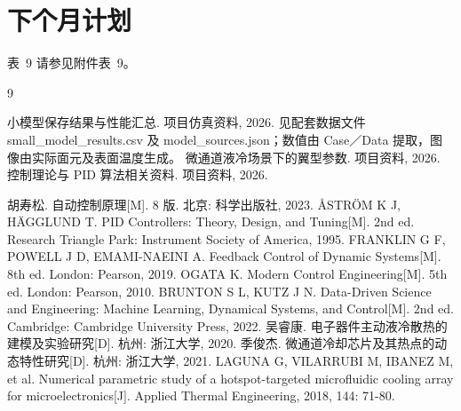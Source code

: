 \documentclass[stage2,fontset=fandol]{ydzjreport}
\makeatletter
\newcommand{\submissionnumber}[1]{\def\@currentlabel{#1}}
\makeatother
\begin{document}
\section{下个月计划}


\par\noindent \begingroup\submissionnumber{9}\label{tab:plan}\endgroup 表~9 请参见附件表~9。\par




\begin{thebibliography}{9}

 小模型保存结果与性能汇总. 项目仿真资料, 2026. 见配套数据文件 small\_model\_results.csv 及 model\_sources.json；数值由 Case／Data 提取，图像由实际面元及表面温度生成。
 微通道液冷场景下的翼型参数. 项目资料, 2026.
 控制理论与 PID 算法相关资料. 项目资料, 2026.

 胡寿松. 自动控制原理[M]. 8 版. 北京: 科学出版社, 2023.
 {\AA}STR{\"O}M K J, H{\"A}GGLUND T. PID Controllers: Theory, Design, and Tuning[M]. 2nd ed. Research Triangle Park: Instrument Society of America, 1995.
 FRANKLIN G F, POWELL J D, EMAMI-NAEINI A. Feedback Control of Dynamic Systems[M]. 8th ed. London: Pearson, 2019.
 OGATA K. Modern Control Engineering[M]. 5th ed. London: Pearson, 2010.
 BRUNTON S L, KUTZ J N. Data-Driven Science and Engineering: Machine Learning, Dynamical Systems, and Control[M]. 2nd ed. Cambridge: Cambridge University Press, 2022.
 吴睿康. 电子器件主动液冷散热的建模及实验研究[D]. 杭州: 浙江大学, 2020.
 季俊杰. 微通道冷却芯片及其热点的动态特性研究[D]. 杭州: 浙江大学, 2021.
 LAGUNA G, VILARRUBI M, IBANEZ M, et al. Numerical parametric study of a hotspot-targeted microfluidic cooling array for microelectronics[J]. Applied Thermal Engineering, 2018, 144: 71-80.
\end{thebibliography}
\end{document}
